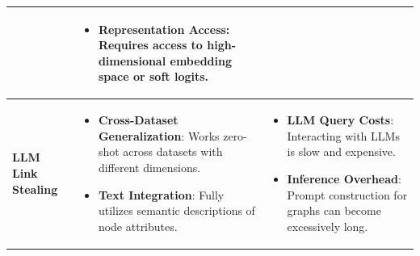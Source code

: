 \documentclass{article}
\begin{document}
\begin{table}[h]
\begin{tabular}{p{2cm} p{6.5cm} p{6.5cm}}
\begin{itemize}
\end{itemize} & 
\begin{itemize}
    \item \textbf{Representation Access}: Requires access to high-dimensional embedding space or soft logits.
\end{itemize} \\
\midrule
\textbf{LLM Link Stealing} & 
\begin{itemize}
    \item \textbf{Cross-Dataset Generalization}: Works zero-shot across datasets with different dimensions.
    \item \textbf{Text Integration}: Fully utilizes semantic descriptions of node attributes.
\end{itemize} & 
\begin{itemize}
    \item \textbf{LLM Query Costs}: Interacting with LLMs is slow and expensive.
    \item \textbf{Inference Overhead}: Prompt construction for graphs can become excessively long.
\end{itemize} \\
\bottomrule
\end{tabular}
\end{table}
\end{document}

